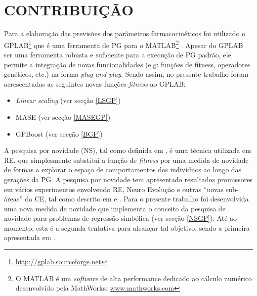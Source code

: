 \section{CONTRIBUIÇÃO}
\label{sec:contribuicao}

Para a elaboração das previsões dos parâmetros farmacocinéticos foi utilizado o 
\ac{GPLAB}\footnote{\url{http://gplab.sourceforge.net}} que é uma ferramenta de \ac{PG} para o MATLAB\footnote{O MATLAB 
é um \emph{software} de alta performance dedicado ao cálculo numérico desenvolvido pela MathWorks: \url{www.mathworks.com}}
\citep{Silva2005}. 
Apesar do \ac{GPLAB} ser uma ferramenta robusta e suficiente para a execução de \ac{PG} padrão, ele permite a integração de novas funcionalidades 
(e.g: funções de fitness, operadores genéticos, etc.) na forma \emph{plug-and-play}. Sendo assim, no presente trabalho foram 
acrescentadas as seguintes novas funções \emph{fitness} ao \ac{GPLAB}:

\begin{itemize}
  	\item{\emph{Linear scaling} \citep{keijzer03} (ver secção \ref{LSGP})}
	\item{\ac{MASE} \citep{Hyndman2006} (ver secção \ref{MASEGP})}
	\item{GPBoost \citep{Hyndman2006} (ver secção \ref{BGP})}
\end{itemize}

A pesquisa por novidade (\ac{NS}), tal como definida em \citep{Lehman2008}, é uma técnica utilizada em \ac{RE}, que
simplesmente substitui a função de \emph{fitness} por uma medida de novidade de formas a explorar o espaço de comportamentos
dos indivíduos ao longo das gerações da \ac{PG}. A pesquisa por novidade tem apresentado resultados promissores em vários
experimentos envolvendo \ac{RE}, Neuro Evolução e outras ``novas sub-áreas'' da \ac{CE}, tal como 
descrito em \citep{Lehman2008} e \citep{lehman2010efficiently}.
Para o presente trabalho foi desenvolvida uma nova medida de novidade que implementa o
conceito da pesquisa de novidade para problemas de regressão simbólica (ver secção \ref{NSGP}). Até ao momento, esta é a segunda tentativa para
alcançar tal objetivo, sendo a primeira apresentada em \citep{Trujillo2013}.